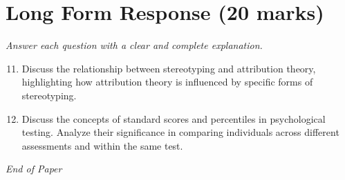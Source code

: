 \documentclass[12pt]{article}
\begin{document}
\section*{Long Form Response (20 marks)}
\textit{Answer each question with a clear and complete explanation.}
\begin{enumerate}[label=\arabic*.]
\setcounter{enumi}{10}
\item Discuss the relationship between stereotyping and attribution theory, highlighting how attribution theory is influenced by specific forms of stereotyping.
\item Discuss the concepts of standard scores and percentiles in psychological testing. Analyze their significance in comparing individuals across different assessments and within the same test.
\end{enumerate}

\vfill
\noindent\textit{End of Paper}
\end{document}
